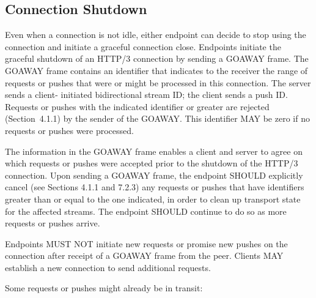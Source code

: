 \documentclass{article}
\begin{document}
\subsection{Connection Shutdown}

Even when a connection is not idle, either endpoint can decide to stop using the connection and initiate a graceful connection close. Endpoints initiate the graceful shutdown of an HTTP/3 connection by sending a GOAWAY frame.  The GOAWAY frame contains an identifier that indicates to the receiver the range of requests or pushes that were or might be processed in this connection.  The server sends a client- initiated bidirectional stream ID; the client sends a push ID. Requests or pushes with the indicated identifier or greater are rejected (Section~4.1.1) by the sender of the GOAWAY.  This identifier MAY be zero if no requests or pushes were processed.

The information in the GOAWAY frame enables a client and server to agree on which requests or pushes were accepted prior to the shutdown of the HTTP/3 connection.  Upon sending a GOAWAY frame, the endpoint SHOULD explicitly cancel (see Sections 4.1.1 and 7.2.3) any requests or pushes that have identifiers greater than or equal to the one indicated, in order to clean up transport state for the affected streams.  The endpoint SHOULD continue to do so as more requests or pushes arrive.

Endpoints MUST NOT initiate new requests or promise new pushes on the connection after receipt of a GOAWAY frame from the peer.  Clients MAY establish a new connection to send additional requests.

Some requests or pushes might already be in transit:
\end{document}
